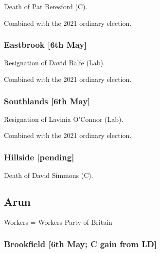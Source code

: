 \documentclass[a4paper,openany]{book}
\begin{document}
\begin{resultsiii}

Death of Pat Beresford (C).

Combined with the 2021 ordinary election.

\subsubsection*{Eastbrook \hspace*{\fill}\nolinebreak[1]%
	\enspace\hspace*{\fill}
	[6th May]}


Resignation of David Balfe (Lab).

Combined with the 2021 ordinary election.

\subsubsection*{Southlands \hspace*{\fill}\nolinebreak[1]%
	\enspace\hspace*{\fill}
	[6th May]}


Resignation of Lavinia O'Connor (Lab).

Combined with the 2021 ordinary election.

\subsubsection*{Hillside \hspace*{\fill}\nolinebreak[1]%
	\enspace\hspace*{\fill}
	[pending]}


Death of David Simmons (C).

\subsection*{Arun}

Workers = Workers Party of Britain

\subsubsection*{Brookfield \hspace*{\fill}\nolinebreak[1]%
	\enspace\hspace*{\fill}
	[6th May; C gain from LD]}


\end{resultsiii}
\end{document}
